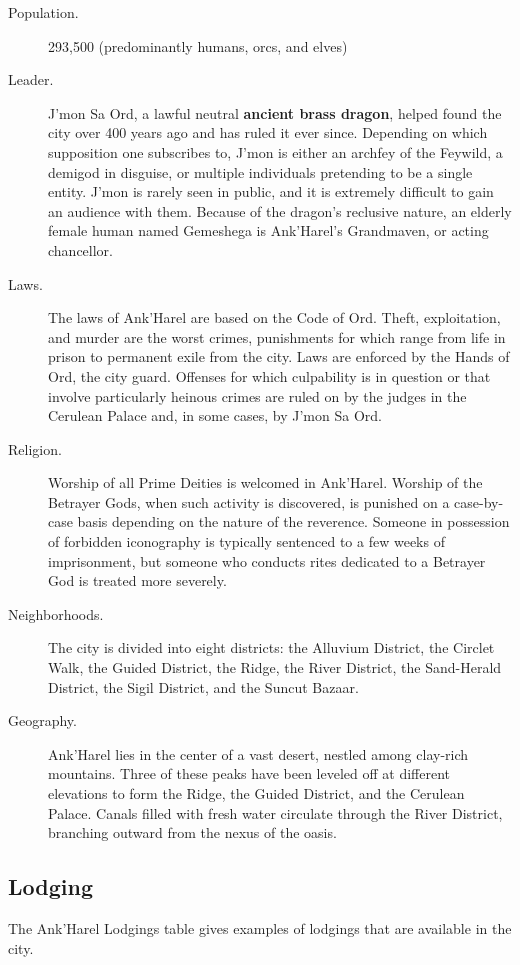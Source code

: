 \documentclass[10pt,a4paper,twoside,fancy,bg=print,twocolumn,openany,nodeprecatedcode]{dndbook}
\begin{document}
\begin{description}
\item[Population.]
293,500 (predominantly humans, orcs, and elves)
\item[Leader.]
J'mon Sa Ord, a lawful neutral \textbf{ancient brass dragon}, helped found the city over 400 years ago and has ruled it ever since. Depending on which supposition one subscribes to, J'mon is either an archfey of the Feywild, a demigod in disguise, or multiple individuals pretending to be a single entity. J'mon is rarely seen in public, and it is extremely difficult to gain an audience with them. Because of the dragon's reclusive nature, an elderly female human named Gemeshega is Ank'Harel's Grandmaven, or acting chancellor.
\item[Laws.]
The laws of Ank'Harel are based on the Code of Ord. Theft, exploitation, and murder are the worst crimes, punishments for which range from life in prison to permanent exile from the city. Laws are enforced by the Hands of Ord, the city guard. Offenses for which culpability is in question or that involve particularly heinous crimes are ruled on by the judges in the Cerulean Palace and, in some cases, by J'mon Sa Ord.
\item[Religion.]
Worship of all Prime Deities is welcomed in Ank'Harel. Worship of the Betrayer Gods, when such activity is discovered, is punished on a case-by-case basis depending on the nature of the reverence. Someone in possession of forbidden iconography is typically sentenced to a few weeks of imprisonment, but someone who conducts rites dedicated to a Betrayer God is treated more severely.
\item[Neighborhoods.]
The city is divided into eight districts: the Alluvium District, the Circlet Walk, the Guided District, the Ridge, the River District, the Sand-Herald District, the Sigil District, and the Suncut Bazaar.
\item[Geography.]
Ank'Harel lies in the center of a vast desert, nestled among clay-rich mountains. Three of these peaks have been leveled off at different elevations to form the Ridge, the Guided District, and the Cerulean Palace. Canals filled with fresh water circulate through the River District, branching outward from the nexus of the oasis.
\end{description}

\subsection{Lodging}
The Ank'Harel Lodgings table gives examples of lodgings that are available in the city.
\end{document}
